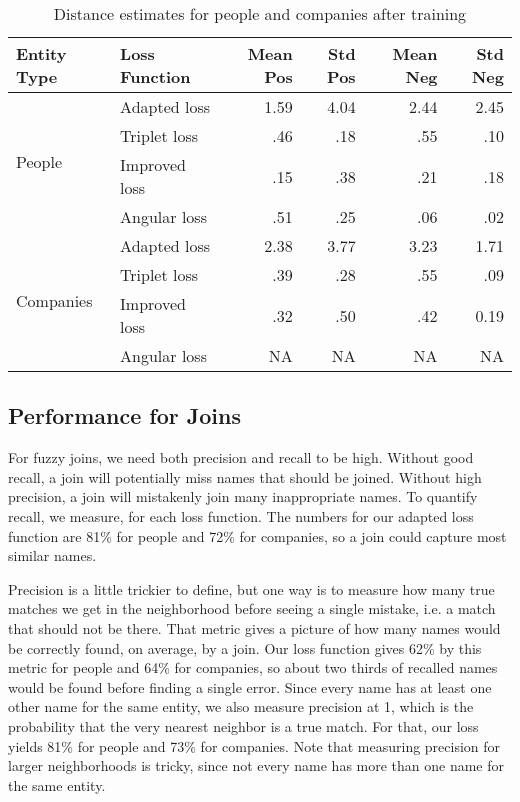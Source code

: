 \begin{table*}[ht]
\caption{Distance estimates for people and companies after training}
\label{Evaluation}
\begin{tabular}{l|l|r|r|r|r|}
\hline
Entity Type & Loss Function & Mean Pos & Std Pos & Mean Neg & Std Neg \\
\hline
\multirow{4}{*}{People} & Adapted loss & 1.59 & 4.04 & 2.44 & 2.45 \\
\hline
& Triplet loss & .46 & .18 & .55 & .10 \\
\hline
& Improved loss & .15 & .38 & .21 & .18 \\
\hline
& Angular loss & .51 & .25 & .06 & .02 \\
\hline
\multirow{4}{*}{Companies} & Adapted loss & 2.38 & 3.77 & 3.23 & 1.71 \\
& Triplet loss & .39 & .28 & .55 & .09 \\
\hline
& Improved loss & .32 & .50 & .42 & 0.19 \\
\hline
& Angular loss & NA & NA & NA & NA \\
\hline
\end{tabular}
\end{table*}


\subsection{Performance for Joins}

 For fuzzy joins, we need both precision and recall to be high.  Without good recall, a join will potentially miss names that should be joined.  Without high precision, a join will mistakenly join many inappropriate names.  To quantify recall, we measure, for each loss function.  The numbers for our adapted loss function are 81\% for people and 72\% for companies, so a join could capture most similar names.

 Precision is a little trickier to define, but one way is to measure how many true matches we get in the neighborhood before seeing a single mistake, i.e. a match that should not be there.  That metric gives a picture of how many names would be correctly found, on average, by a join.  Our loss function gives 62\% by this metric for people and 64\% for companies, so about two thirds of recalled names would be found before finding a single error.  Since every name has at least one other name for the same entity, we also measure precision at 1, which is the probability that the very nearest neighbor is a true match.  For that, our loss yields 81\% for people and 73\% for companies.  Note that measuring precision for larger neighborhoods is tricky, since not every name has more than one name for the same entity.

